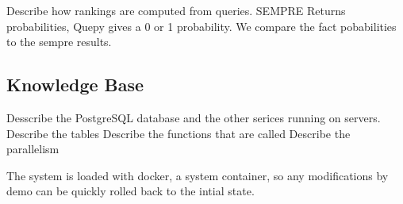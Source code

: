 Describe how rankings are computed from queries.
SEMPRE Returns probabilities, Quepy gives a 0 or 1 probability.
We compare the fact pobabilities to the sempre results.

\subsection{Knowledge Base}

Desscribe the PostgreSQL database and the other serices running on servers.
Describe the tables 
Describe the functions that are called
Describe the parallelism

The system is loaded with docker, a system container, so any modifications by demo can be quickly rolled back to the intial state.






